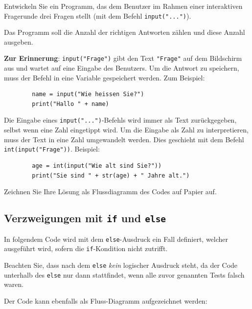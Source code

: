 \begin{myexercise}
	Entwickeln Sie ein Programm, das dem Benutzer im Rahmen einer interaktiven Fragerunde drei Fragen stellt (mit dem Befehl \lstinline|input("...")|).

	Das Programm soll die Anzahl der richtigen Antworten
	zählen und diese Anzahl ausgeben.

	\textbf{Zur Erinnerung}: \lstinline|input("Frage")| gibt den Text \lstinline|"Frage"| auf dem Bildschirm aus und wartet auf eine Eingabe des Benutzers. Um die Antwort zu speichern, muss der Befehl in eine Variable gespeichert werden. Zum Beispiel:

	\begin{lstlisting}
		name = input("Wie heissen Sie?")
		print("Hallo " + name)
	\end{lstlisting}

	Die Eingabe eines \lstinline|input("...")|-Befehls wird immer als Text zurückgegeben, selbst wenn eine Zahl eingetippt wird. Um die Eingabe als Zahl zu interpretieren, muss der Text in eine Zahl umgewandelt werden. Dies geschieht mit dem Befehl \lstinline|int(input("Frage"))|. Beispiel:

	\begin{lstlisting}
		age = int(input("Wie alt sind Sie?"))
		print("Sie sind " + str(age) + " Jahre alt.")
	\end{lstlisting}

	Zeichnen Sie Ihre Lösung als Flussdiagramm des Codes auf Papier auf.
	\begin{myanswer}
		
	\end{myanswer}
\end{myexercise}


\subsection{Verzweigungen mit \texorpdfstring{\lstinline|if|}{if} und \texorpdfstring{\lstinline|else|}{else}}

\begin{myexample}
In folgendem Code wird mit dem \lstinline|else|-Ausdruck ein Fall definiert, welcher ausgeführt wird, sofern die \lstinline|if|-Kondition nicht zutrifft.


Beachten Sie, dass nach dem \lstinline|else| \textit{kein} logischer Ausdruck steht, da der Code unterhalb des \lstinline|else| nur dann stattfindet, wenn alle zuvor genannten Tests falsch waren.

Der Code kann ebenfalls als Fluss-Diagramm aufgezeichnet werden:
\begin{figure}[H]
	\centering
	
\end{figure}
\end{myexample}

